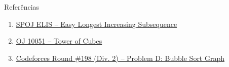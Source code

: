 \begin{frame}[fragile]{Referências}

    \begin{enumerate}
        \item \href{https://www.spoj.com/problems/ELIS/}{SPOJ ELIS -- Easy Longest Increasing
            Subsequence}

        \item \href{https://onlinejudge.org/index.php?option=onlinejudge&page=show_problem&problem=992}{OJ 10051 -- Tower of Cubes}

        \item \href{http://codeforces.com/problemset/problem/340/D}{Codeforces Round \#198 (Div. 2) -- Problem D: Bubble Sort Graph}
    \end{enumerate}

\end{frame}
